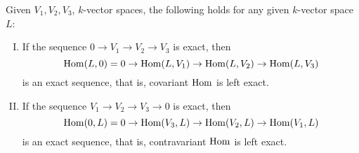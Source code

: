 \begin{proposition}
  Given \(V_1, V_2, V_3\), \(k\)-vector spaces, the following holds for any
  given \(k\)-vector space \(L\):
  \begin{enumerate}[I.]
    \item If the sequence \(0 \to V_1 \to V_2 \to V_3\) is exact, then
      \[
          \operatorname{Hom}(L, 0) = 0 \to \operatorname{Hom}(L, V_1) \to \operatorname{Hom}(L, V_2) \to \operatorname{Hom}(L, V_3)
      \]
      is an exact sequence, that is, covariant \(\operatorname{Hom}\) is left exact.
    \item If the sequence \(V_1 \to V_2 \to V_3 \to 0\) is exact, then
      \[
          \operatorname{Hom}(0, L) = 0 \to \operatorname{Hom}(V_3, L) \to \operatorname{Hom}(V_2, L) \to \operatorname{Hom}(V_1, L)
      \]
      is an exact sequence, that is, contravariant \(\operatorname{Hom}\) is left exact.
  \end{enumerate}
\end{proposition}

